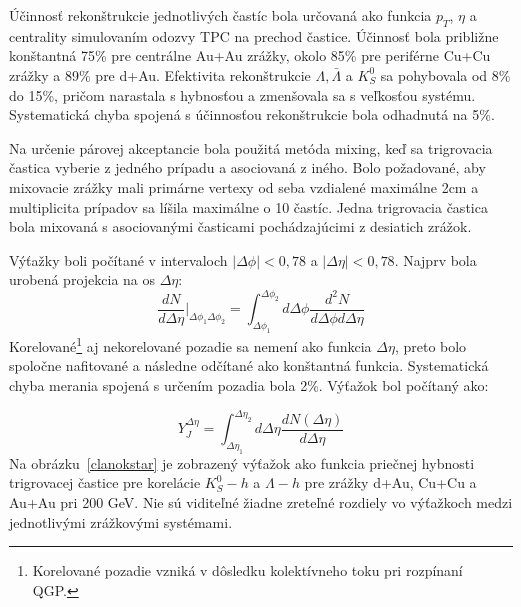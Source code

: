 \documentclass[thesismargins, thesislinespacing]{rnthesis}
\begin{document}
Účinnosť rekonštrukcie jednotlivých častíc bola určovaná ako funkcia $p_T$, $\eta$ a centrality simulovaním odozvy TPC na prechod častice. Účinnosť bola približne konštantná 75\% pre centrálne Au+Au zrážky, okolo 85\% pre periférne Cu+Cu zrážky a 89\% pre d+Au. Efektivita rekonštrukcie $\Lambda, \bar{\Lambda}$ a $K^0_S$ sa pohybovala od 8\% do 15\%, pričom narastala s hybnosťou a zmenšovala sa s veľkosťou systému. Systematická chyba spojená s účinnosťou rekonštrukcie bola odhadnutá na 5\%.

Na určenie párovej akceptancie bola použitá metóda mixing, keď sa trigrovacia častica vyberie z jedného prípadu a asociovaná z iného. Bolo požadované, aby mixovacie zrážky mali primárne vertexy od seba vzdialené maximálne 2cm a multiplicita prípadov sa líšila maximálne o 10 častíc. Jedna trigrovacia častica bola mixovaná s asociovanými časticami pochádzajúcimi z desiatich zrážok.

Výťažky boli počítané v intervaloch $|\Delta\phi|<0,78$ a $|\Delta\eta|<0,78$. Najprv bola urobená projekcia na os $\Delta\eta$:
\begin{equation}
\frac{dN}{d\Delta\eta}|_{\Delta\phi_1 \Delta\phi_2}= \int_{\Delta\phi_1}^{\Delta\phi_2}d\Delta\phi \frac{d^2N}{d\Delta \phi d\Delta \eta}
\end{equation}
Korelované\footnote{Korelované pozadie vzniká v dôsledku kolektívneho toku pri rozpínaní QGP.} aj nekorelované pozadie sa nemení ako funkcia $\Delta \eta$, preto bolo spoločne nafitované a následne odčítané ako konštantná funkcia. Systematická chyba merania spojená s určením pozadia bola 2\%. Výťažok bol počítaný ako:

\begin{equation}
Y^{\Delta\eta}_J=\int_{\Delta\eta_1}^{\Delta\eta_2}d\Delta\eta \frac{dN(\Delta\eta)}{d\Delta\eta}
\end{equation}
Na obrázku~\ref{clanokstar} je zobrazený výťažok ako funkcia priečnej hybnosti trigrovacej častice pre korelácie $K_S^0 - h$ a $\Lambda-h$ pre zrážky d+Au, Cu+Cu a Au+Au pri 200 GeV. Nie sú viditeľné žiadne zreteľné rozdiely vo výťažkoch medzi jednotlivými zrážkovými systémami. 
\end{document}
